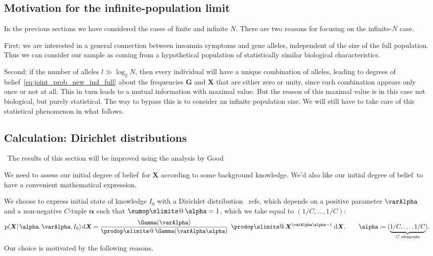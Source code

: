 \documentclass[\ifafour a4paper,12pt,\else a5paper,10pt,\fi%
onecolumn,oneside,article,%
british%
]{memoir}
\makeatletter
\theoremstyle{remark}
\theoremstyle{innote}
\def\sum{\DOTSI\sumop\slimits@}
\def\prod{\DOTSI\prodop\slimits@}
\newcommand*{\citep}{\parencites}
\newcommand*{\citey}{\parencites*}
\newcommand*{\di}{\mathrm{d}}%
\newcommand*{\defd}{\coloneqq}
\newcommand*{\pf}{\mathrm{p}}%
\renewcommand*{\|}{\mathpunct{|}}
\newcommand*{\sect}{\S}%
\newcommand*{\chaps}{chs}%
\newcommand*{\tprod}{\mathop{\textstyle\prod}\nolimits}
\newcommand*{\tsum}{\mathop{\textstyle\sum}\nolimits}
\newcommand*{\puzzle}{\maltese}
\newcommand{\mynote}[1]{ {\color{notecolour}\puzzle\ #1}}
\newcommand*{\dob}{degree of belief}
\newcommand*{\dobs}{degrees of belief}
\newcommand*{\ysum}{\tsum}
\newcommand*{\yprod}{\tprod}
\newcommand*{\yFg}{\bm{G}}
\newcommand*{\yF}{\bm{X}}
\newcommand*{\yIo}{I_{0}}
\newcommand*{\yA}{\varAlpha}
\newcommand*{\ya}{\bm{\alpha}}
\makeatother
\begin{document}
\subsection{Motivation for the infinite-population limit}
\label{sec:motivation_Ninf}

In the previous sections we have considered the cases of finite and
infinite $N$. There are two reasons for focusing on the infinite-$N$ case.

First: we are interested in a general connection between
insomnia symptoms and gene alleles, independent of the size of the full
population. Thus we can consider our sample as coming from a hypothetical
population of statistically similar biological characteristics.

Second: if the number of alleles $l\gg\log_{2}N$, then every individual
will have a unique combination of alleles, leading to \dobs\
\eqref{eq:joint_prob_new_ind_full} about the frequencies $\yFg$ and $\yF$
that are either zero or unity, since each combination appears only once or
not at all. This in turn leads to a mutual information with maximal value.
But the reason of this maximal value is in this case not biological, but
purely statistical. The way to bypass this is to consider an infinite
population size. We will still have to take care of this statistical
phenomenon in what follows.

\subsection{Calculation: Dirichlet distributions}
\label{sec:2nd_calculation_unif_marginals}

\mynote{The results of this section will be improved using the analysis by
  Good \citey[\chaps~4--5]{good1965}{good1980}}


We need to assess our initial \dob\ for $\yF$ according to some background
knowledge. We'd also like our initial \dob\ to have a convenient
mathematical expression.

We choose to express initial state of knowledge $\yIo$ with a Dirichlet
distribution \mynote{refs}, which depends on a positive parameter $\yA$ and
a non-negative $C$-tuple $\ya$ such that $\ysum\ya=1$, which we take equal
to $(1/C,\dotsc,1/C)$:
\begin{equation}
  \label{eq:dirichlet_prior}
  \pf(\yF \| \ya, \yA,\yIo)\,\di\yF =
  \frac{\Gamma(\yA)}{\yprod\Gamma(\yA\ya)}\;
  \yprod \yF^{\yA\ya-1}\;\di\yF,\qquad
  \ya \defd (\underbrace{1/C,\dotsc,1/C}_{\text{$C$ elements}}).
\end{equation}
Our choice is motivated by the following reasons.
\end{document}
